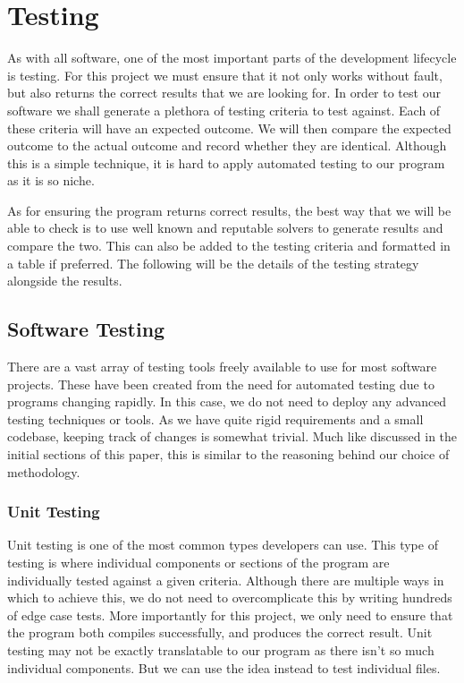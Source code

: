 \documentclass{article}
\begin{document}
\section{Testing}
As with all software, one of the most important parts of the development lifecycle is testing. For
this project we must ensure that it not only works without fault, but also returns the correct
results that we are looking for. In order to test our software we shall generate a plethora of
testing criteria to test against. Each of these criteria will have an expected outcome. We will then
compare the expected outcome to the actual outcome and record whether they are identical. Although
this is a simple technique, it is hard to apply automated testing to our program as it is so niche.

As for ensuring the program returns correct results, the best way that we will be able to check is
to use well known and reputable solvers to generate results and compare the two. This can also be
added to the testing criteria and formatted in a table if preferred. The following will be the
details of the testing strategy alongside the results.

\subsection{Software Testing}
There are a vast array of testing tools freely available to use for most software projects. These
have been created from the need for automated testing due to programs changing rapidly. In this
case, we do not need to deploy any advanced testing techniques or tools. As we have quite rigid
requirements and a small codebase, keeping track of changes is somewhat trivial. Much like discussed
in the initial sections of this paper, this is similar to the reasoning behind our choice of
methodology.

\subsubsection{Unit Testing}
Unit testing is one of the most common types developers can use. This type of testing is where individual components or sections
of the program are individually tested against a given criteria. Although there are multiple ways in which to achieve this, we do
not need to overcomplicate this by writing hundreds of edge case tests. More importantly for this project, we only need to ensure
that the program both compiles successfully, and produces the correct result. Unit testing may not be exactly translatable to our program as there isn't so much individual components. But we can use the idea instead to test individual files.
\end{document}
